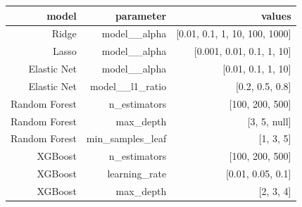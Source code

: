 \begin{tabular}{@{}rrr@{}}
\toprule
model & parameter & values \\
\midrule
Ridge & model\_\_alpha & [0.01, 0.1, 1, 10, 100, 1000] \\
Lasso & model\_\_alpha & [0.001, 0.01, 0.1, 1, 10] \\
Elastic Net & model\_\_alpha & [0.01, 0.1, 1, 10] \\
Elastic Net & model\_\_l1\_ratio & [0.2, 0.5, 0.8] \\
Random Forest & n\_estimators & [100, 200, 500] \\
Random Forest & max\_depth & [3, 5, null] \\
Random Forest & min\_samples\_leaf & [1, 3, 5] \\
XGBoost & n\_estimators & [100, 200, 500] \\
XGBoost & learning\_rate & [0.01, 0.05, 0.1] \\
XGBoost & max\_depth & [2, 3, 4] \\
\bottomrule
\end{tabular}
